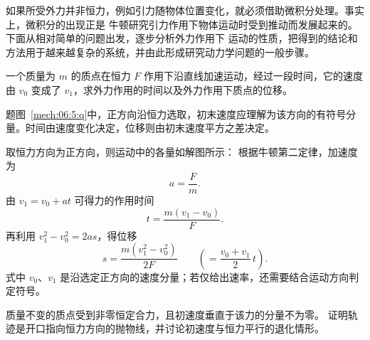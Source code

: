 {如果所受外力并非恒力，例如引力随物体位置变化，就必须借助微积分处理。事实上，微积分的出现正是
牛顿研究引力作用下物体运动时受到推动而发展起来的。下面从相对简单的问题出发，逐步分析外力作用下
运动的性质，把得到的结论和方法用于越来越复杂的系统，并由此形成研究动力学问题的一般步骤。

\begin{origexamplebox}{}\label{ch06:ex:s04-2-5}
一个质量为 $m$ 的质点在恒力 $F$ 作用下沿直线加速运动，经过一段时间，它的速度由 $v_0$
变成了 $v_1$，求外力作用的时间以及外力作用下质点的位移。

\begin{qualityfigure}
\label{mech:06:5:q}
\end{qualityfigure}
\end{origexamplebox}

\begin{xesolution}题图~\ref{mech:06:5:q}中，正方向沿恒力选取，初末速度应理解为该方向的有符号分量。时间由速度变化决定，位移则由初末速度平方之差决定。

取恒力方向为正方向，则运动中的各量如解图所示：
\soldiagTwoFive
根据牛顿第二定律，加速度为
\[
  a=\frac{F}{m}.
\]
由 $v_1=v_0+at$ 可得力的作用时间
\[
  \boxed{t=\frac{m(v_1-v_0)}{F}}.
\]
再利用 $v_1^2-v_0^2=2as$，得位移
\[
  \boxed{s=\frac{m(v_1^2-v_0^2)}{2F}}
  \qquad
  \left(=\frac{v_0+v_1}{2}\,t\right).
\]
式中 $v_0$、$v_1$ 是沿选定正方向的速度分量；若仅给出速率，还需要结合运动方向判定符号。
\end{xesolution}

\begin{origexamplebox}{}\label{ch06:ex:s04-2-6}
质量不变的质点受到非零恒定合力，且初速度垂直于该力的分量不为零。
证明轨迹是开口指向恒力方向的抛物线，并讨论初速度与恒力平行的退化情形。

\begin{qualityfigure}
\label{mech:06:6:q}
\end{qualityfigure}
\end{origexamplebox}

}
